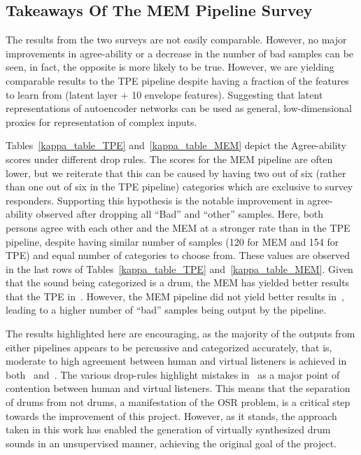 \documentclass[\main/thesis.tex]{subfiles}
\begin{document}
\subsection{Takeaways Of The MEM Pipeline Survey}
\label{survey2_takeaway}
The results from the two surveys are not easily comparable. However, no major improvements in agree-ability or a decrease in the number of bad samples can be seen, in fact, the opposite is more likely to be true. However, we are yielding comparable results to the TPE pipeline despite having a fraction of the features to learn from (latent layer + 10 envelope features). Suggesting that latent representations of autoencoder networks can be used as general, low-dimensional proxies for representation of complex inputs. 

Tables~\ref{kappa_table_TPE} and~\ref{kappa_table_MEM} depict the Agree-ability scores under different drop rules. The scores for the MEM pipeline are often lower, but we reiterate that this can be caused by having two out of six (rather than one out of six in the TPE pipeline) categories which are exclusive to survey responders. Supporting this hypothesis is the notable improvement in agree-ability observed after dropping all \enquote{Bad} and \enquote{other} samples. Here, both persons agree with each other and the MEM at a stronger rate than in the TPE pipeline, despite having similar number of samples (120 for MEM and 154 for TPE) and equal number of categories to choose from. These values are observed in the last rows of Tables~\ref{kappa_table_TPE} and~\ref{kappa_table_MEM}. Given that the sound being categorized is a drum, the MEM has yielded better results that the TPE in~\decsecond. However, the MEM pipeline did not yield better results in~\decfirst, leading to a higher number of \enquote{bad} samples being output by the pipeline.

The results highlighted here are encouraging, as the majority of the outputs from either pipelines appears to be percussive and categorized accurately, that is, moderate to high agreement between human and virtual listeners is achieved in both \decfirst~and~\decsecond. The various drop-rules highlight mistakes in \decfirst~as a major point of contention between human and virtual listeners. This means that the separation of drums from not drums, a manifestation of the OSR problem, is a critical step towards the improvement of this project. However, as it stands, the approach taken in this work has enabled the generation of virtually synthesized drum sounds in an unsupervised manner, achieving the original goal of the project. 
\end{document}
